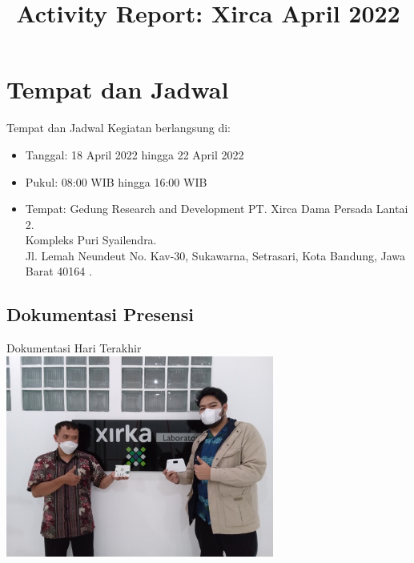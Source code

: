\documentclass[table,dvipsnames]{beamer}
\title[Xirca042022]{Activity Report: Xirca April 2022}
\author{}
\institute[VibrasticLab : \ccbysa]{
	Achmadi ST MT
}
\date{}
\begin{document}
    \begin{frame}
        \titlepage
    \end{frame}

	\section{Tempat dan Jadwal}
	\begin{frame}
		\begin{exampleblock}{Tempat dan Jadwal}
			Kegiatan berlangsung di:
			\begin{itemize}
				\item Tanggal: 18 April 2022 hingga 22 April 2022
				\item Pukul: 08:00 WIB hingga 16:00 WIB
				\item Tempat: Gedung Research and Development PT. Xirca Dama Persada Lantai 2.\\
				Kompleks Puri Syailendra.\\
				Jl. Lemah Neundeut No. Kav-30, Sukawarna, Setrasari, Kota Bandung, Jawa Barat 40164 .
			\end{itemize}
		\end{exampleblock}
	\end{frame}

	\begin{frame}
		\subsection{Dokumentasi Presensi}
		\begin{exampleblock}{Dokumentasi Hari Terakhir}
			\centering
			\includegraphics[width=250pt]{images/last_day}
		\end{exampleblock}
	\end{frame}
	
\end{document}
